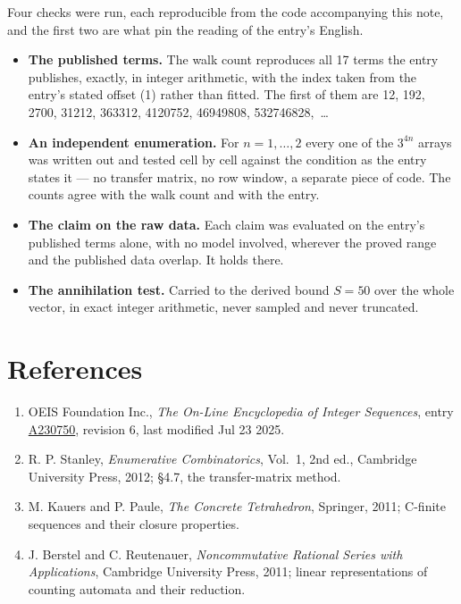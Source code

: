 \documentclass[11pt]{article}
\theoremstyle{definition}
\begin{document}
Four checks were run, each reproducible from the code accompanying this note, and the first two are what pin the reading of the entry's English.

\begin{itemize}

\item {\bfseries The published terms.} The walk count reproduces all 17 terms the entry publishes, exactly, in integer arithmetic, with the index taken from the entry's stated offset (1) rather than fitted. The first of them are 12, 192, 2700, 31212, 363312, 4120752, 46949808, 532746828,~\dots

\item {\bfseries An independent enumeration.} For $n = 1,\dots,2$ every one of the $3^{4n}$ arrays was written out and tested cell by cell against the condition as the entry states it --- no transfer matrix, no row window, a separate piece of code. The counts agree with the walk count and with the entry.

\item {\bfseries The claim on the raw data.} Each claim was evaluated on the entry's published terms alone, with no model involved, wherever the proved range and the published data overlap. It holds there.

\item {\bfseries The annihilation test.} Carried to the derived bound $S = 50$ over the whole vector, in exact integer arithmetic, never sampled and never truncated.

\end{itemize}

\section{References}

\begin{enumerate}

\item OEIS Foundation Inc., \emph{The On-Line Encyclopedia of Integer Sequences}, entry \href{https://oeis.org/A230750}{A230750}, revision 6, last modified Jul 23 2025.

\item R. P. Stanley, \emph{Enumerative Combinatorics}, Vol.~1, 2nd ed., Cambridge University Press, 2012; \S4.7, the transfer-matrix method.

\item M. Kauers and P. Paule, \emph{The Concrete Tetrahedron}, Springer, 2011; C-finite sequences and their closure properties.

\item J. Berstel and C. Reutenauer, \emph{Noncommutative Rational Series with Applications}, Cambridge University Press, 2011; linear representations of counting automata and their reduction.

\end{enumerate}
\end{document}

